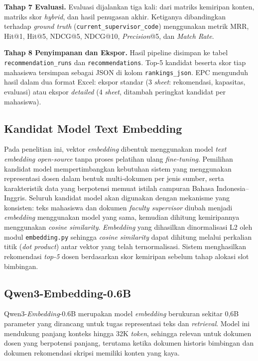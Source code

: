 \textbf{Tahap 7 Evaluasi.} Evaluasi dijalankan tiga kali: dari matriks kemiripan konten, matriks skor \textit{hybrid}, dan hasil penugasan akhir. Ketiganya dibandingkan terhadap \textit{ground truth} (\texttt{current\_supervisor\_code}) menggunakan metrik MRR, Hit@1, Hit@5, NDCG@5, NDCG@10, \textit{Precision}@5, dan \textit{Match Rate}.

\textbf{Tahap 8 Penyimpanan dan Ekspor.} Hasil pipeline disimpan ke tabel \texttt{recommendation\_runs} dan \texttt{recommendations}. Top-5 kandidat beserta skor tiap mahasiswa tersimpan sebagai JSON di kolom \texttt{rankings\_json}. EPC mengunduh hasil dalam dua format Excel: ekspor standar (3 \textit{sheet}: rekomendasi, kapasitas, evaluasi) atau ekspor \textit{detailed} (4 \textit{sheet}, ditambah peringkat kandidat per mahasiswa).

\subsection{Kandidat Model Text Embedding}\label{kandidat-model-text-embedding}

Pada penelitian ini, vektor \textit{embedding} dibentuk menggunakan model \textit{text embedding} \textit{open-source} tanpa proses pelatihan ulang \textit{fine-tuning}. Pemilihan kandidat model mempertimbangkan kebutuhan sistem yang menggunakan representasi dosen dalam bentuk multi-dokumen per jenis sumber, serta karakteristik data yang berpotensi memuat istilah campuran Bahasa Indonesia--Inggris. Seluruh kandidat model akan digunakan dengan mekanisme yang konsisten: teks mahasiswa dan dokumen \textit{faculty supervisor} diubah menjadi \textit{embedding} menggunakan model yang sama, kemudian dihitung kemiripannya menggunakan \textit{cosine similarity}. \textit{Embedding} yang dihasilkan dinormalisasi L2 oleh modul \texttt{embedding.py} sehingga \textit{cosine similarity} dapat dihitung melalui perkalian titik (\textit{dot product}) antar vektor yang telah ternormalisasi. Sistem menghasilkan rekomendasi \textit{top-5} dosen berdasarkan skor kemiripan sebelum tahap alokasi slot bimbingan.

\subsection{Qwen3-Embedding-0.6B}\label{qwen3-embedding-0.6b-1}

Qwen3-\textit{Embedding}-0.6B merupakan model \textit{embedding} berukuran sekitar 0,6B parameter yang dirancang untuk tugas representasi teks dan \textit{retrieval}. Model ini mendukung panjang konteks hingga 32K \textit{token}, sehingga relevan untuk dokumen dosen yang berpotensi panjang, terutama ketika dokumen historis bimbingan dan dokumen rekomendasi skripsi memiliki konten yang kaya.

